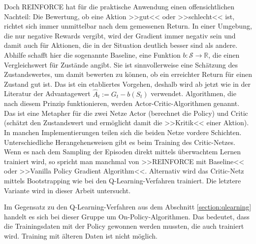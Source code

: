 Doch REINFORCE hat für die praktische Anwendung einen offensichtlichen Nachteil: Die Bewertung, ob eine Aktion >>gut<< oder >>schlecht<< ist, richtet sich immer unmittelbar nach dem gemessenen Return.
In einer Umgebung, die nur negative Rewards vergibt, wird der Gradient immer negativ sein und damit auch für Aktionen, die in der Situation deutlich besser sind als andere.
Abhilfe schafft hier die sogenannte Baseline, eine Funktion $b: \mathcal{S} \rightarrow \mathbb{R}$, die einen Vergleichswert für Zustände angibt.
Sie ist sinnvollerweise eine Schätzung des Zustandswertes, um damit bewerten zu können, ob ein erreichter Return für einen Zustand gut ist.
Das ist ein etabliertes Vorgehen, deshalb wird ab jetzt wie in der Literatur der Advantagewert $\hat{A}_t := G_t - b(S_t)$ verwendet.
Algorithmen, die nach diesem Prinzip funktionieren, werden Actor-Critic-Algorithmen genannt.
Das ist eine Metapher für die zwei Netze Actor (berechnet die Policy) und Critic (schätzt den Zustandswert und ermöglicht damit die >>Kritik<< einer Aktion).
In manchen Implementierungen teilen sich die beiden Netze vordere Schichten.
Unterschiedliche Herangehensweisen gibt es beim Training des Critic-Netzes.
Wenn es nach dem Sampling der Episoden direkt mittels überwachtem Lernen trainiert wird, so spricht man manchmal von >>REINFORCE mit Baseline<< oder >>Vanilla Policy Gradient Algorithm<<.
Alternativ wird das Critic-Netz mittels Bootstrapping wie bei den Q-Learning-Verfahren trainiert.
Die letztere Variante wird in dieser Arbeit untersucht.

Im Gegensatz zu den Q-Learning-Verfahren aus dem Abschnitt \ref{section:qlearning} handelt es sich bei dieser Gruppe um On-Policy-Algorithmen.
Das bedeutet, dass die Trainingsdaten mit der Policy gewonnen werden mussten, die auch trainiert wird.
Training mit älteren Daten ist nicht möglich.

